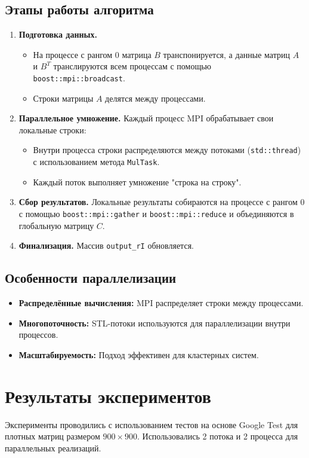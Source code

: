 \documentclass[a4paper,12pt]{article}
\begin{document}
\subsection{Этапы работы алгоритма}
\begin{enumerate}
    \item \textbf{Подготовка данных.} 
    \begin{itemize}
        \item На процессе с рангом 0 матрица \( B \) транспонируется, а данные матриц \( A \) и \( B^T \) транслируются всем процессам с помощью \texttt{boost::mpi::broadcast}.
        \item Строки матрицы \( A \) делятся между процессами.
    \end{itemize}
    \item \textbf{Параллельное умножение.} Каждый процесс MPI обрабатывает свои локальные строки:
    \begin{itemize}
        \item Внутри процесса строки распределяются между потоками (\texttt{std::thread}) с использованием метода \texttt{MulTask}.
        \item Каждый поток выполняет умножение "строка на строку".
    \end{itemize}
    \item \textbf{Сбор результатов.} Локальные результаты собираются на процессе с рангом 0 с помощью \texttt{boost::mpi::gather} и \texttt{boost::mpi::reduce} и объединяются в глобальную матрицу \( C \).
    \item \textbf{Финализация.} Массив \texttt{output\_rI} обновляется.
\end{enumerate}

\subsection{Особенности параллелизации}
\begin{itemize}
    \item \textbf{Распределённые вычисления:} MPI распределяет строки между процессами.
    \item \textbf{Многопоточность:} STL-потоки используются для параллелизации внутри процессов.
    \item \textbf{Масштабируемость:} Подход эффективен для кластерных систем.
\end{itemize}

\section{Результаты экспериментов}
Эксперименты проводились с использованием тестов на основе Google Test для плотных матриц размером \( 900 \times 900 \). Использовались 2 потока и 2 процесса для параллельных реализаций.
\end{document}
